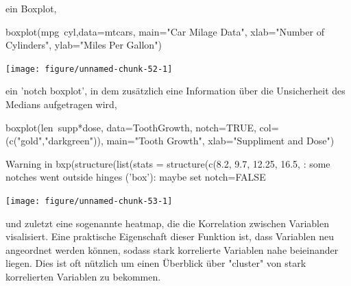 \documentclass[a4paper,twoside]{tufte-book}\usepackage[]{graphicx}\usepackage[]{color}
\begin{document}
\begin{appendices}
ein Boxplot, 

\begin{Schunk}
\begin{Sinput}
boxplot(mpg~cyl,data=mtcars, main="Car Milage Data", 
   xlab="Number of Cylinders", ylab="Miles Per Gallon")
\end{Sinput}


{\centering \texttt{[image: figure/unnamed-chunk-52-1]} 

}

\end{Schunk}

ein 'notch boxplot', in dem zusätzlich eine Information über die Unsicherheit des Medians aufgetragen wird,

\begin{Schunk}
\begin{Sinput}
boxplot(len~supp*dose, data=ToothGrowth, notch=TRUE, 
  col=(c("gold","darkgreen")),
  main="Tooth Growth", xlab="Suppliment and Dose")
\end{Sinput}
\begin{Soutput}
Warning in bxp(structure(list(stats = structure(c(8.2, 9.7, 12.25, 16.5, : some notches went outside hinges ('box'): maybe set notch=FALSE
\end{Soutput}


{\centering \texttt{[image: figure/unnamed-chunk-53-1]} 

}

\end{Schunk}


und zuletzt eine sogenannte heatmap, die die Korrelation zwischen Variablen visalisiert. Eine praktische Eigenschaft dieser Funktion ist, dass Variablen neu angeordnet werden können, sodass stark korrelierte Variablen nahe beieinander liegen. Dies ist oft nützlich um einen Überblick über "cluster" von stark korrelierten Variablen zu bekommen.


\end{appendices}
\end{document}
